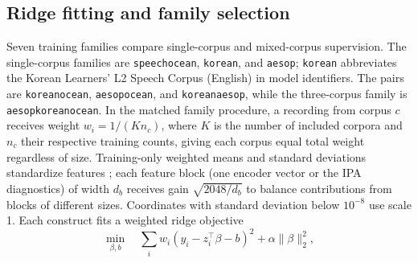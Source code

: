 \documentclass[10pt]{article}
\begin{document}
\subsection{Ridge fitting and family selection}
Seven training families compare single-corpus and mixed-corpus supervision. The single-corpus families are \texttt{speechocean}, \texttt{korean}, and \texttt{aesop}; \texttt{korean} abbreviates the Korean Learners' L2 Speech Corpus (English) in model identifiers. The pairs are \texttt{koreanocean}, \texttt{aesopocean}, and \texttt{koreanaesop}, while the three-corpus family is \texttt{aesopkoreanocean}. In the matched family procedure, a recording from corpus $c$ receives weight $w_i=1/(K n_c)$, where $K$ is the number of included corpora and $n_c$ their respective training counts, giving each corpus equal total weight regardless of size. Training-only weighted means and standard deviations standardize features \cite{esl}; each feature block (one encoder vector or the IPA diagnostics) of width $d_b$ receives gain $\sqrt{2048/d_b}$ to balance contributions from blocks of different sizes. Coordinates with standard deviation below $10^{-8}$ use scale 1. Each construct fits a weighted ridge objective \cite{ridge,esl}
\begin{equation}
\min_{\beta,b}\quad\sum_i w_i(y_i-z_i^\top\beta-b)^2+\alpha\lVert\beta\rVert_2^2,
\end{equation}
\end{document}
